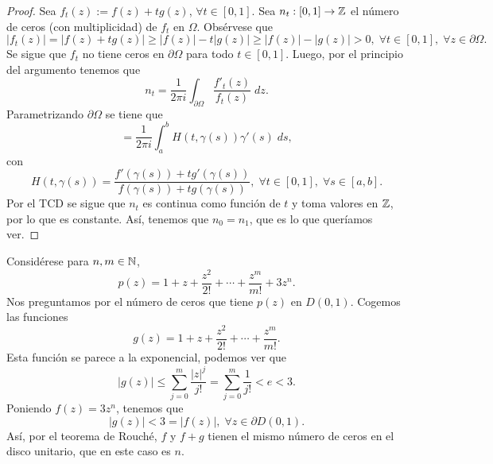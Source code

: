 \begin{proof}
	Sea $\displaystyle f_{t}\left(z\right):=f\left(z\right)+tg\left(z\right) $, $\displaystyle \forall t \in \left[0,1\right]  $. Sea $\displaystyle n_{t}:\left[0,1\right] \to \mathbb{Z} $ el número de ceros (con multiplicidad) de $\displaystyle f_{t} $ en $\displaystyle \Omega  $. Obsérvese que 
	\[ \left|f_{t}\left(z\right)\right|= \left|f\left(z\right)+tg\left(z\right)\right|\geq \left|f\left(z\right)\right|-t \left|g\left(z\right)\right| \geq \left|f\left(z\right)\right|- \left|g\left(z\right)\right| > 0, \; \forall t \in \left[0,1\right] , \; \forall z \in \partial \Omega  .\]
	Se sigue que $\displaystyle f_{t} $ no tiene ceros en $\displaystyle \partial \Omega  $ para todo $\displaystyle t \in \left[0,1\right]  $. Luego, por el principio del argumento tenemos que 
	\[n_{t}=\frac{1}{2\pi i}\int _{\partial \Omega }\frac{f'_{t}\left(z\right)}{f_{t}\left(z\right)} \; dz .\]
	Parametrizando $\displaystyle \partial \Omega  $ se tiene que
	\[ = \frac{1}{2\pi i}\int^{b}_{a} H\left(t, \gamma\left(s\right)\right)\gamma'\left(s\right) \; d s,\]
con 
\[H\left(t, \gamma\left(s\right)\right)=\frac{f'\left(\gamma\left(s\right)\right)+tg'\left(\gamma\left(s\right)\right)}{f\left(\gamma\left(s\right)\right)+tg\left(\gamma\left(s\right)\right)}, \; \forall t \in \left[0,1\right] , \; \forall s \in \left[a,b\right]  .\]
Por el TCD se sigue que $\displaystyle n_{t} $ es continua como función de $\displaystyle t $ y toma valores en $\displaystyle \mathbb{Z} $, por lo que es constante. Así, tenemos que $\displaystyle n_{0}=n_{1} $, que es lo que queríamos ver. 
\end{proof}
\begin{eg}
Considérese para $\displaystyle n,m\in \mathbb{N} $, 
\[p\left(z\right)=1 + z + \frac{z^{2}}{2!} + \cdots + \frac{z^{m}}{m!} + 3z^{n} .\]
Nos preguntamos por el número de ceros que tiene $\displaystyle p\left(z\right) $ en $\displaystyle D\left(0,1\right) $. Cogemos las funciones
\[g\left(z\right)=1 + z + \frac{z^{2}}{2!} + \cdots + \frac{z^{m}}{m!} .\]
Esta función se parece a la exponencial, podemos ver que 
\[ \left|g\left(z\right)\right| \leq \sum^{m}_{j = 0}\frac{ \left|z\right|^{j}}{j!} = \sum^{m}_{j = 0}\frac{1}{j!}<e<3 .\]
Poniendo $\displaystyle f\left(z\right)=3z^{n} $, tenemos que 
\[ \left|g\left(z\right)\right| < 3 = \left|f\left(z\right)\right|, \; \forall z \in \partial D\left(0,1\right) .\]
Así, por el teorema de Rouché, $\displaystyle f $ y $\displaystyle f + g $ tienen el mismo número de ceros en el disco unitario, que en este caso es $\displaystyle n $. 
\end{eg}

